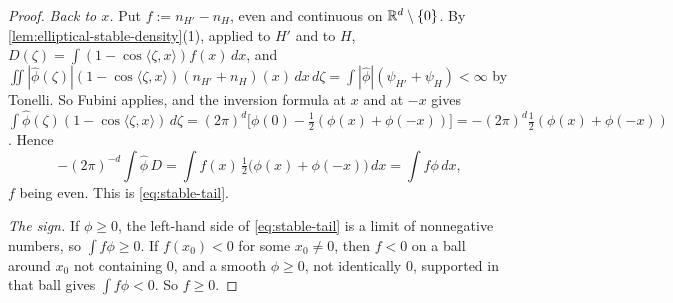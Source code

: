 \begin{proof}
\emph{Back to $x$.} Put $f := n_{H'} - n_H$, even and continuous on $\mathbb{R}^d \setminus \{0\}$. By
\ref{lem:elliptical-stable-density}(1), applied to $H'$ and to $H$,
$D(\zeta) = \int(1 - \cos\langle\zeta,x\rangle)f(x)\,dx$, and
$\iint|\widehat\phi(\zeta)|(1 - \cos\langle\zeta,x\rangle)(n_{H'} + n_H)(x)\,dx\,d\zeta
= \int|\widehat\phi|(\psi_{H'} + \psi_H) < \infty$ by Tonelli. So Fubini applies, and the inversion
formula at $x$ and at $-x$ gives
$\int\widehat\phi(\zeta)(1 - \cos\langle\zeta,x\rangle)\,d\zeta = (2\pi)^d\bigl[\phi(0) -
\tfrac12(\phi(x) + \phi(-x))\bigr] = -(2\pi)^d\tfrac12(\phi(x) + \phi(-x))$. Hence
\[
  -(2\pi)^{-d}\int\widehat\phi\,D = \int f(x)\,\tfrac12\bigl(\phi(x) + \phi(-x)\bigr)\,dx
  = \int f\phi\,dx ,
\]
$f$ being even. This is \ref{eq:stable-tail}.

\emph{The sign.} If $\phi \ge 0$, the left-hand side of \ref{eq:stable-tail} is a limit of
nonnegative numbers, so $\int f\phi \ge 0$. If $f(x_0) < 0$ for some $x_0 \ne 0$, then $f < 0$ on a
ball around $x_0$ not containing $0$, and a smooth $\phi \ge 0$, not identically $0$, supported in
that ball gives $\int f\phi < 0$. So $f \ge 0$.
\end{proof}

